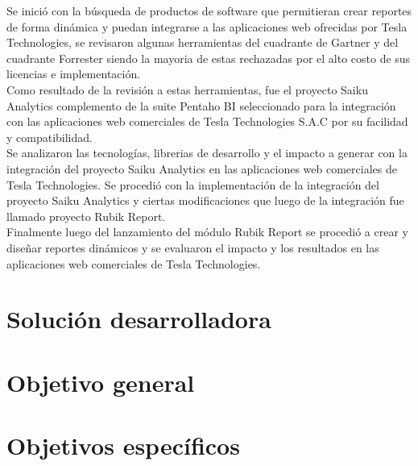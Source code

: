 \begin{spacing}{1.5}
	Se inició con la búsqueda de productos de software que permitieran crear reportes de forma dinámica y puedan integrarse a las aplicaciones web ofrecidas por Tesla Technologies, se revisaron algunas herramientas del cuadrante de Gartner y del cuadrante Forrester siendo la mayoria de estas rechazadas por el alto costo de sus licencias e implementación.\\
	Como resultado de la revisión a estas herramientas, fue el proyecto Saiku Analytics complemento de la suite Pentaho BI seleccionado para la integración con las aplicaciones web comerciales de Tesla Technologies S.A.C por su facilidad y compatibilidad.\\
	Se analizaron las tecnologías, librerias de desarrollo y el impacto a generar  con la integración del proyecto Saiku Analytics en las aplicaciones web comerciales de Tesla Technologies.
	Se procedió con la implementación de la integración del proyecto Saiku Analytics y ciertas modificaciones que luego de la integración fue llamado proyecto Rubik Report.\\
	Finalmente luego del lanzamiento del módulo Rubik Report se procedió a crear y diseñar reportes dinámicos y se evaluaron el impacto y los resultados en las aplicaciones web comerciales de Tesla Technologies.\\

\end{spacing}

\section{Soluci\'{o}n desarrolladora}
\begin{spacing}{1.5}
\end{spacing}
\section{Objetivo general}
\begin{spacing}{1.5}
\end{spacing}
\section{Objetivos espec\'{i}ficos}
\begin{spacing}{1.5}
\end{spacing}


	
